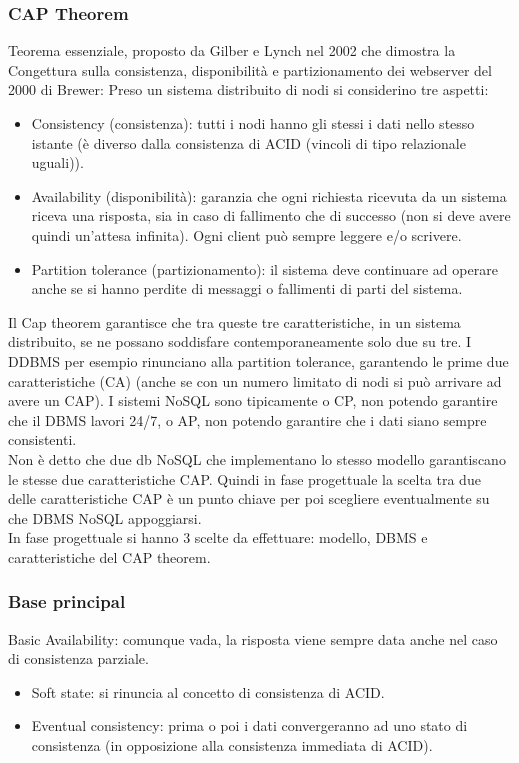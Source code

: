 \subsubsection{CAP Theorem}
Teorema essenziale, proposto da Gilber e Lynch nel 2002 che dimostra la Congettura sulla consistenza, disponibilità e partizionamento dei webserver del 2000 di Brewer:
Preso un sistema distribuito di nodi si considerino tre aspetti:
\begin{itemize}
    \item Consistency (consistenza): tutti i nodi hanno gli stessi i dati nello stesso istante (è diverso dalla consistenza di ACID (vincoli di tipo relazionale uguali)).
    \item Availability (disponibilità): garanzia che ogni richiesta ricevuta da un sistema riceva una risposta, sia in caso di fallimento che di successo (non si deve avere quindi un’attesa infinita). Ogni client può sempre leggere e/o scrivere.
    \item Partition tolerance (partizionamento): il sistema deve continuare ad operare anche se si hanno perdite di messaggi o fallimenti di parti del sistema.
\end{itemize}
Il Cap theorem garantisce che tra queste tre caratteristiche, in un sistema distribuito, se ne possano soddisfare contemporaneamente solo due su tre. I DDBMS per esempio rinunciano alla partition tolerance, garantendo le prime due caratteristiche (CA) (anche se con un numero limitato di nodi si può arrivare ad avere un CAP).
I sistemi NoSQL sono tipicamente o CP, non potendo garantire che il DBMS lavori 24/7, o AP, non potendo garantire che i dati siano sempre consistenti.  \\ 
Non è detto che due db NoSQL che implementano lo stesso modello garantiscano le stesse due caratteristiche CAP. Quindi in fase progettuale la scelta tra due delle caratteristiche CAP è un punto chiave per poi scegliere eventualmente su che DBMS NoSQL appoggiarsi.\\
In fase progettuale si hanno 3 scelte da effettuare: modello, DBMS e caratteristiche del CAP theorem.

\subsubsection{Base principal}
Basic Availability: comunque vada, la risposta viene sempre data anche nel caso di consistenza parziale.
\begin{itemize}
    \item Soft state: si rinuncia al concetto di consistenza di ACID.
    \item Eventual consistency: prima o poi i dati convergeranno ad uno stato di consistenza (in opposizione alla consistenza immediata di ACID).
\end{itemize}
